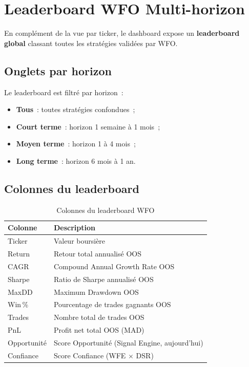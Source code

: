 \section{Leaderboard WFO Multi-horizon}
\label{sec:leaderboard}

En complément de la vue par ticker, le dashboard expose un \textbf{leaderboard global}
classant toutes les stratégies validées par WFO.

\subsection{Onglets par horizon}

Le leaderboard est filtré par horizon~:
\begin{itemize}
    \item \textbf{Tous}~: toutes stratégies confondues~;
    \item \textbf{Court terme}~: horizon 1 semaine à 1 mois~;
    \item \textbf{Moyen terme}~: horizon 1 à 4 mois~;
    \item \textbf{Long terme}~: horizon 6 mois à 1 an.
\end{itemize}

\subsection{Colonnes du leaderboard}

\begin{table}[H]
\centering
\caption{Colonnes du leaderboard WFO}
\label{tab:leaderboard_cols}
\begin{tabularx}{\linewidth}{@{}lY@{}}
\toprule
\textbf{Colonne} & \textbf{Description} \\
\midrule
Ticker           & Valeur boursière \\
Return           & Retour total annualisé OOS \\
CAGR             & Compound Annual Growth Rate OOS \\
Sharpe           & Ratio de Sharpe annualisé OOS \\
MaxDD            & Maximum Drawdown OOS \\
Win\,\%          & Pourcentage de trades gagnants OOS \\
Trades           & Nombre total de trades OOS \\
PnL              & Profit net total OOS (MAD) \\
Opportunité      & Score Opportunité (Signal Engine, aujourd'hui) \\
Confiance        & Score Confiance (WFE $\times$ DSR) \\
\bottomrule
\end{tabularx}
\end{table}

